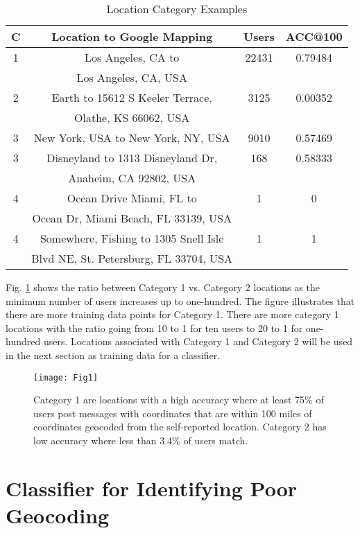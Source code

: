\begin{table}
\small
\renewcommand{\arraystretch}{1.2}
\caption{Location Category Examples}
\label{table_ch2_3}
\centering
\begin{tabular}{|c|c|c|c|}
\hline
\bfseries C & \bfseries Location to Google Mapping & \bfseries Users & \bfseries ACC@100\\
\hline
1&Los Angeles, CA to&22431&0.79484\\
&Los Angeles, CA, USA& & \\
\hline
2&Earth to 15612 S Keeler Terrace,&3125&0.00352\\
&Olathe, KS 66062, USA& & \\
\hline
3&New York, USA to New York, NY, USA&9010&0.57469\\
\hline
3&Disneyland to 1313 Disneyland Dr,&168&0.58333\\
&Anaheim, CA 92802, USA& & \\
\hline
4&Ocean Drive Miami, FL to&1&0\\
&Ocean Dr, Miami Beach, FL 33139, USA& & \\
\hline
4&Somewhere, Fishing to 1305 Snell Isle&1&1\\
&Blvd NE, St. Petersburg, FL 33704, USA& & \\
\hline
\end{tabular}
\end{table}

Fig. \ref{fig_ch2_1} shows the ratio between Category 1 vs. Category 2 locations as the minimum number of users increases up to one-hundred. The figure illustrates that there are more training data points for Category 1. There are more category 1 locations with the ratio going from 10 to 1 for ten users to 20 to 1 for one-hundred users. Locations associated with Category 1 and Category 2 will be used in the next section as training data for a classifier. 

\begin{figure}[!t]
\centering
\texttt{[image: Fig1]}
\caption[Category 1 vs. Category 2 location frequency]{Category 1 are locations with a high accuracy where at least 75\% of users post messages with coordinates that are within 100 miles of coordinates geocoded from the self-reported location. Category 2 has low accuracy where less than 3.4\% of users match.}
\label{fig_ch2_1}
\end{figure}

\section{Classifier for Identifying Poor Geocoding}

